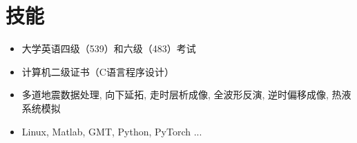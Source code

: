 \section{技能}

\begin{itemize}
\item 大学英语四级（539）和六级（483）考试
\item 计算机二级证书（C语言程序设计）
\item 多道地震数据处理, 向下延拓, 走时层析成像, 全波形反演, 逆时偏移成像, 热液系统模拟
\item Linux, Matlab, GMT, Python, PyTorch ...
\end{itemize}
